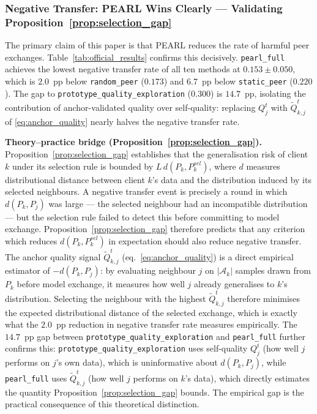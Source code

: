 \documentclass[conference]{IEEEtran}
\begin{document}
\subsubsection{Negative Transfer: PEARL Wins Clearly — Validating Proposition~\ref{prop:selection_gap}}
\label{subsubsec:official-neg-transfer}

The primary claim of this paper is that PEARL reduces the rate of harmful peer exchanges. Table~\ref{tab:official_results} confirms this decisively. \texttt{pearl\_full} achieves the lowest negative transfer rate of all ten methods at $0.153\pm0.050$, which is $2.0$~pp below \texttt{random\_peer} ($0.173$) and $6.7$~pp below \texttt{static\_peer} ($0.220$). The gap to \texttt{prototype\_quality\_exploration} ($0.300$) is $14.7$~pp, isolating the contribution of anchor-validated quality over self-quality: replacing $Q_j^t$ with $\tilde{Q}^t_{k,j}$ of \eqref{eq:anchor_quality} nearly halves the negative transfer rate.

\textbf{Theory--practice bridge (Proposition~\ref{prop:selection_gap}).}
Proposition~\ref{prop:selection_gap} establishes that the generalisation risk of client $k$ under its selection rule is bounded by $L\,d(P_k, P^{sel}_k)$, where $d$ measures distributional distance between client $k$'s data and the distribution induced by its selected neighbours. A negative transfer event is precisely a round in which $d(P_k, P_j)$ was large --- the selected neighbour had an incompatible distribution --- but the selection rule failed to detect this before committing to model exchange. Proposition~\ref{prop:selection_gap} therefore predicts that any criterion which reduces $d(P_k, P^{sel}_k)$ in expectation should also reduce negative transfer. The anchor quality signal $\tilde{Q}^t_{k,j}$ (eq.~\eqref{eq:anchor_quality}) is a direct empirical estimator of $-d(P_k, P_j)$: by evaluating neighbour $j$ on $|\mathcal{A}_k|$ samples drawn from $P_k$ before model exchange, it measures how well $j$ already generalises to $k$'s distribution. Selecting the neighbour with the highest $\tilde{Q}^t_{k,j}$ therefore minimises the expected distributional distance of the selected exchange, which is exactly what the $2.0$~pp reduction in negative transfer rate measures empirically. The $14.7$~pp gap between \texttt{prototype\_quality\_exploration} and \texttt{pearl\_full} further confirms this: \texttt{prototype\_quality\_exploration} uses self-quality $Q_j^t$ (how well $j$ performs on $j$'s own data), which is uninformative about $d(P_k, P_j)$, while \texttt{pearl\_full} uses $\tilde{Q}^t_{k,j}$ (how well $j$ performs on $k$'s data), which directly estimates the quantity Proposition~\ref{prop:selection_gap} bounds. The empirical gap is the practical consequence of this theoretical distinction.
\end{document}
